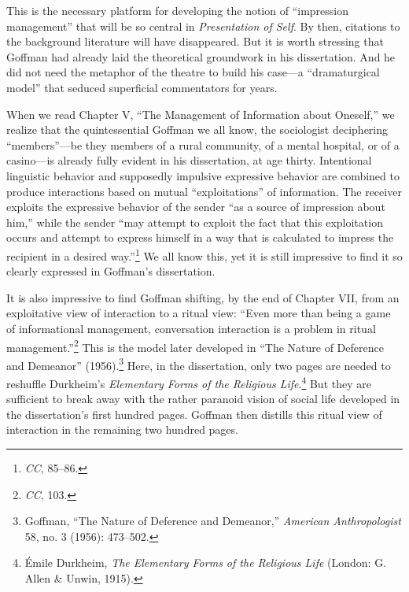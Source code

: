\documentclass[openany,nobib]{tufte-book}
\begin{document}
\noindent This is the necessary platform for developing the notion of ``impression
management'' that will be so central in \emph{Presentation of Self}. By
then, citations to the background literature will have disappeared. But
it is worth stressing that Goffman had already laid the theoretical
groundwork in his dissertation. And he did not need the metaphor of the
theatre to build his case---a ``dramaturgical model'' that seduced
superficial commentators for years.

When we read Chapter V, ``The Management of Information about Oneself,''
we realize that the quintessential Goffman we all know, the sociologist
deciphering ``members''---be they members of a rural community, of a
mental hospital, or of a casino---is already fully evident in his
dissertation, at age thirty. Intentional linguistic behavior and
supposedly impulsive expressive behavior are combined to produce
interactions based on mutual ``exploitations'' of information. The
receiver exploits the expressive behavior of the sender ``as a source of
impression about him,'' while the sender ``may attempt to exploit the
fact that this exploitation occurs and attempt to express himself in a
way that is calculated to impress the recipient in a desired
way.''\footnote{\emph{CC}, 85--86.} We all know this, yet it is still
impressive to find it so clearly expressed in Goffman's dissertation.

It is also impressive to find Goffman shifting, by the end of Chapter
VII, from an exploitative view of interaction to a ritual view: ``Even
more than being a game of informational management, conversation
interaction is a problem in ritual management.''\footnote{\emph{CC},
  103.} This is the model later developed in ``The Nature of Deference
and Demeanor'' (1956).\footnote{Goffman, ``The Nature of Deference and
  Demeanor,'' \emph{American Anthropologist} 58, no. 3 (1956): 473--502.}
Here, in the dissertation, only two pages are needed to reshuffle
Durkheim's \emph{Elementary Forms of the Religious Life}.\footnote{Émile
  Durkheim, \emph{The Elementary Forms of the Religious Life} (London:
  G. Allen \& Unwin, 1915).} But they are sufficient to break away with
the rather paranoid vision of social life developed in the
dissertation's first hundred pages. Goffman then distills this ritual
view of interaction in the remaining two hundred pages.
\end{document}
